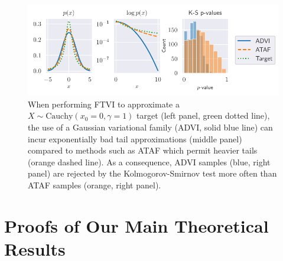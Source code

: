 \documentclass[thesis.tex]{subfiles}
\begin{document}
\begin{figure}[htbp]
  \centering
  \includegraphics{../Figures/fat_tail_ks.pdf}
  \vspace{-6mm}
  \caption{
    When performing FTVI to approximate a $X \sim \text{Cauchy}(x_0 = 0, \gamma = 1)$ target (left panel, green dotted line),
    the use of a Gaussian variational family (ADVI, solid blue line) can incur
    exponentially bad tail approximations (middle panel) compared to
    methods such as ATAF which permit heavier tails (orange dashed line).
    As a consequence, ADVI samples (blue, right panel) are rejected by
    the Kolmogorov-Smirnov test more often than ATAF samples (orange, right panel).
  }
  \label{fig:cauchy_normal_student}
\end{figure}

\section{Proofs of Our Main Theoretical Results}
\label{sec:proofs}
\end{document}
